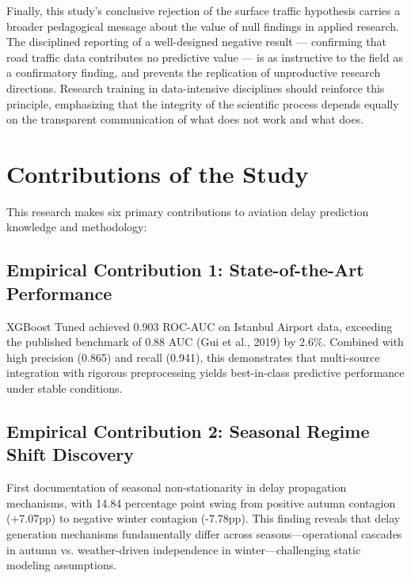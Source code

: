 \documentclass{report}
\begin{document}
Finally, this study's conclusive rejection of the surface traffic hypothesis carries a
broader pedagogical message about the value of null findings in applied research. The
disciplined reporting of a well-designed negative result --- confirming that road traffic
data contributes no predictive value --- is as instructive to the field as a confirmatory
finding, and prevents the replication of unproductive research directions. Research training
in data-intensive disciplines should reinforce this principle, emphasizing that the integrity
of the scientific process depends equally on the transparent communication of what does not
work and what does.





\section{Contributions of the Study}
\label{sec:contributions}

This research makes six primary contributions to aviation delay prediction knowledge and methodology:

\subsection{Empirical Contribution 1: State-of-the-Art Performance}

XGBoost Tuned achieved 0.903 ROC-AUC on Istanbul Airport data, exceeding the published benchmark of 0.88 AUC (Gui et al., 2019) by 2.6\%. Combined with high precision (0.865) and recall (0.941), this demonstrates that multi-source integration with rigorous preprocessing yields best-in-class predictive performance under stable conditions.

\subsection{Empirical Contribution 2: Seasonal Regime Shift Discovery}

First documentation of seasonal non-stationarity in delay propagation mechanisms, with 14.84 percentage point swing from positive autumn contagion (+7.07pp) to negative winter contagion (-7.78pp). This finding reveals that delay generation mechanisms fundamentally differ across seasons—operational cascades in autumn vs. weather-driven independence in winter—challenging static modeling assumptions.
\end{document}
